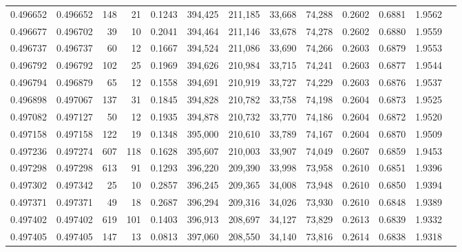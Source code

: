 \begin{tabular}{rrrrrrrrrrrrr}
0.496652 & 0.496652 &   148 &    21 &                                     0.1243 & 394,425 & 211,185 &  33,668 &  74,288 & 0.2602 & 0.6881 & 1.9562 \\
0.496677 & 0.496702 &    39 &    10 &                                     0.2041 & 394,464 & 211,146 &  33,678 &  74,278 & 0.2602 & 0.6880 & 1.9559 \\
0.496737 & 0.496737 &    60 &    12 &                                     0.1667 & 394,524 & 211,086 &  33,690 &  74,266 & 0.2603 & 0.6879 & 1.9553 \\
0.496792 & 0.496792 &   102 &    25 &                                     0.1969 & 394,626 & 210,984 &  33,715 &  74,241 & 0.2603 & 0.6877 & 1.9544 \\
0.496794 & 0.496879 &    65 &    12 &                                     0.1558 & 394,691 & 210,919 &  33,727 &  74,229 & 0.2603 & 0.6876 & 1.9537 \\
0.496898 & 0.497067 &   137 &    31 &                                     0.1845 & 394,828 & 210,782 &  33,758 &  74,198 & 0.2604 & 0.6873 & 1.9525 \\
0.497082 & 0.497127 &    50 &    12 &                                     0.1935 & 394,878 & 210,732 &  33,770 &  74,186 & 0.2604 & 0.6872 & 1.9520 \\
0.497158 & 0.497158 &   122 &    19 &                                     0.1348 & 395,000 & 210,610 &  33,789 &  74,167 & 0.2604 & 0.6870 & 1.9509 \\
0.497236 & 0.497274 &   607 &   118 &                                     0.1628 & 395,607 & 210,003 &  33,907 &  74,049 & 0.2607 & 0.6859 & 1.9453 \\
0.497298 & 0.497298 &   613 &    91 &                                     0.1293 & 396,220 & 209,390 &  33,998 &  73,958 & 0.2610 & 0.6851 & 1.9396 \\
0.497302 & 0.497342 &    25 &    10 &                                     0.2857 & 396,245 & 209,365 &  34,008 &  73,948 & 0.2610 & 0.6850 & 1.9394 \\
0.497371 & 0.497371 &    49 &    18 &                                     0.2687 & 396,294 & 209,316 &  34,026 &  73,930 & 0.2610 & 0.6848 & 1.9389 \\
0.497402 & 0.497402 &   619 &   101 &                                     0.1403 & 396,913 & 208,697 &  34,127 &  73,829 & 0.2613 & 0.6839 & 1.9332 \\
0.497405 & 0.497405 &   147 &    13 &                                     0.0813 & 397,060 & 208,550 &  34,140 &  73,816 & 0.2614 & 0.6838 & 1.9318 \\

\end{tabular}
